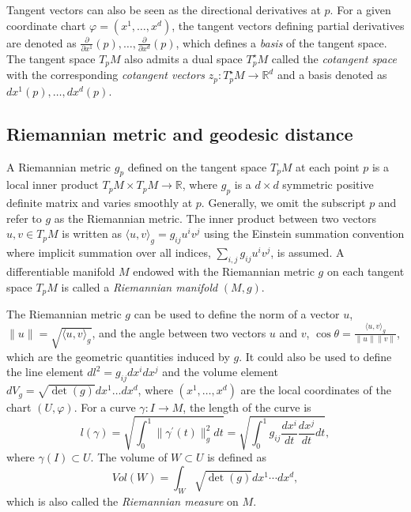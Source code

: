 \documentclass[11pt,a4paper,]{article}
\begin{document}
Tangent vectors can also be seen as the directional derivatives at \(p\). For a given coordinate chart \(\varphi=(x^1,\dots,x^d)\), the tangent vectors defining partial
derivatives are denoted as \(\frac{\partial}{\partial x^1}(p),\dots,\frac{\partial}{\partial x^d}(p)\), which defines a \emph{basis} of the tangent space.
The tangent space \(T_pM\) also admits a dual space \(T^\star_pM\) called the \emph{cotangent space} with the corresponding \emph{cotangent vectors} \(z_p: T^\star_pM \rightarrow \mathbb{R}^d\) and a basis denoted as \(dx^1(p),\dots,dx^d(p)\).

\hypertarget{riemannian-metric-and-geodesic-distance}{%
\subsection{Riemannian metric and geodesic distance}\label{riemannian-metric-and-geodesic-distance}}

A Riemannian metric \(g_p\) defined on the tangent space \(T_pM\) at each point \(p\) is a local inner product \(T_pM \times T_pM \rightarrow \mathbb{R}\), where \(g_p\) is a \(d\times d\) symmetric positive definite matrix and varies smoothly at \(p\). Generally, we
omit the subscript \(p\) and refer to \(g\) as the Riemannian metric. The inner product between two vectors \(u, v \in T_pM\) is written as \(\langle u, v \rangle_g = g_{ij}u^iv^j\) using the Einstein summation convention where implicit summation over all indices, \(\sum_{i,j} g_{ij}u^iv^j\), is assumed. A differentiable manifold \(M\) endowed with the Riemannian metric \(g\) on each tangent space \(T_pM\) is called a \emph{Riemannian manifold} \((M,g)\).

The Riemannian metric \(g\) can be used to define the norm of a vector \(u\), \(\|u\| = \sqrt{\langle u,v \rangle_g}\), and the angle between two vectors \(u\) and \(v\), \(\cos\theta = \frac{\langle u,v \rangle_g}{\|u\| \|v\|}\), which are the geometric quantities induced by \(g\). It could also be used to define the line element \(dl^2 = g_{ij}dx^i dx^j\) and the volume element \(dV_g = \sqrt{\det(g)}dx^1 \dots dx^d\), where \((x^1,\dots,x^d)\) are the local coordinates of the chart \((U, \varphi)\).
For a curve \(\gamma: I \rightarrow M\), the length of the curve is
\[
l(\gamma) = \sqrt{\int_0^1 \|\gamma^\prime(t)\|^2_g dt} = \sqrt{\int_0^1 g_{ij} \frac{dx^i}{dt} \frac{dx^j}{dt} dt},
\]
where \(\gamma(I) \subset U\). The volume of \(W \subset U\) is defined as
\[
Vol(W) = \int_W \sqrt{\det(g)}dx^1 \cdots dx^d,
\]
which is also called the \emph{Riemannian measure} on \(M\).
\end{document}
